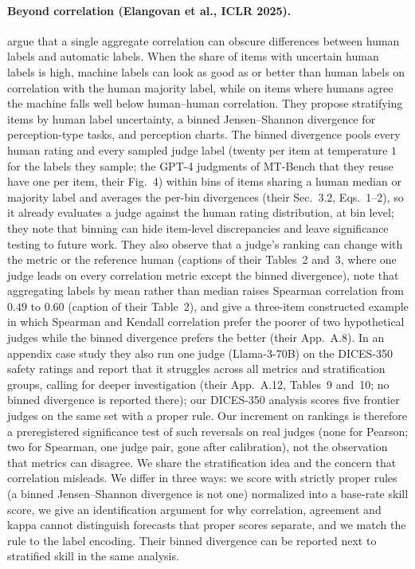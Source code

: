 \paragraph{Beyond correlation (Elangovan et al., ICLR 2025).}
\citet{elangovan2025beyond} argue that a single aggregate correlation can obscure differences between human labels and automatic labels.
When the share of items with uncertain human labels is high, machine labels can look as good as or better than human labels on correlation with the human majority label, while on items where humans agree the machine falls well below human--human correlation.
They propose stratifying items by human label uncertainty, a binned Jensen--Shannon divergence for perception-type tasks, and perception charts.
The binned divergence pools every human rating and every sampled judge label (twenty per item at temperature $1$ for the labels they sample; the GPT-4 judgments of MT-Bench that they reuse have one per item, their Fig.~4) within bins of items sharing a human median or majority label and averages the per-bin divergences (their Sec.~3.2, Eqs.~1--2), so it already evaluates a judge against the human rating distribution, at bin level; they note that binning can hide item-level discrepancies and leave significance testing to future work.
They also observe that a judge's ranking can change with the metric or the reference human (captions of their Tables~2 and~3, where one judge leads on every correlation metric except the binned divergence), note that aggregating labels by mean rather than median raises Spearman correlation from $0.49$ to $0.60$ (caption of their Table~2), and give a three-item constructed example in which Spearman and Kendall correlation prefer the poorer of two hypothetical judges while the binned divergence prefers the better (their App.~A.8).
In an appendix case study they also run one judge (Llama-3-70B) on the DICES-350 safety ratings and report that it struggles across all metrics and stratification groups, calling for deeper investigation (their App.~A.12, Tables~9 and~10; no binned divergence is reported there); our DICES-350 analysis scores five frontier judges on the same set with a proper rule.
Our increment on rankings is therefore a preregistered significance test of such reversals on real judges (none for Pearson; two for Spearman, one judge pair, gone after calibration), not the observation that metrics can disagree.
We share the stratification idea and the concern that correlation misleads.
We differ in three ways: we score with strictly proper rules (a binned Jensen--Shannon divergence is not one) normalized into a base-rate skill score, we give an identification argument for why correlation, agreement and kappa cannot distinguish forecasts that proper scores separate, and we match the rule to the label encoding.
Their binned divergence can be reported next to stratified skill in the same analysis.

